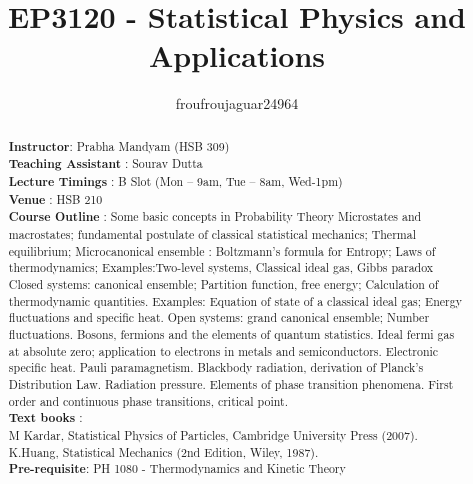 \documentclass[a4paper]{report}
\author{froufroujaguar24964}
\title{EP3120 - Statistical Physics and Applications}
\begin{document}
\maketitle

\begin{abstract}
\textbf{Instructor}: Prabha Mandyam (HSB 309) \\
\textbf{Teaching Assistant} : Sourav Dutta \\
\textbf{Lecture Timings} : B Slot (Mon – 9am, Tue – 8am, Wed-1pm)\\
\textbf{Venue} : HSB 210\\
\textbf{Course Outline} : Some basic concepts in Probability Theory Microstates and macrostates; fundamental postulate of classical statistical mechanics; Thermal equilibrium; Microcanonical ensemble : Boltzmann's formula for Entropy; Laws of thermodynamics; Examples:Two-level systems, Classical ideal gas, Gibbs paradox Closed systems: canonical ensemble; Partition function, free energy; Calculation of thermodynamic quantities. Examples: Equation of state of a classical ideal gas; Energy fluctuations and specific heat. Open systems: grand canonical ensemble; Number fluctuations. Bosons, fermions and the elements of quantum statistics. Ideal fermi gas at absolute zero; application to electrons in metals and semiconductors. Electronic specific heat. Pauli paramagnetism. Blackbody radiation, derivation of Planck's Distribution Law. Radiation pressure. Elements of phase transition phenomena. First order and continuous phase transitions, critical point.\\
\textbf{Text books} : \\M Kardar, Statistical Physics of Particles, Cambridge University Press (2007). \\
K.Huang, Statistical Mechanics (2nd Edition, Wiley, 1987).\\
\textbf{Pre-requisite}:  PH 1080 - Thermodynamics and Kinetic Theory\\
\end{abstract}

\newpage

\tableofcontents


\newpage
\appendix
\appendixpage



\newpage
\printbibliography
\end{document}

